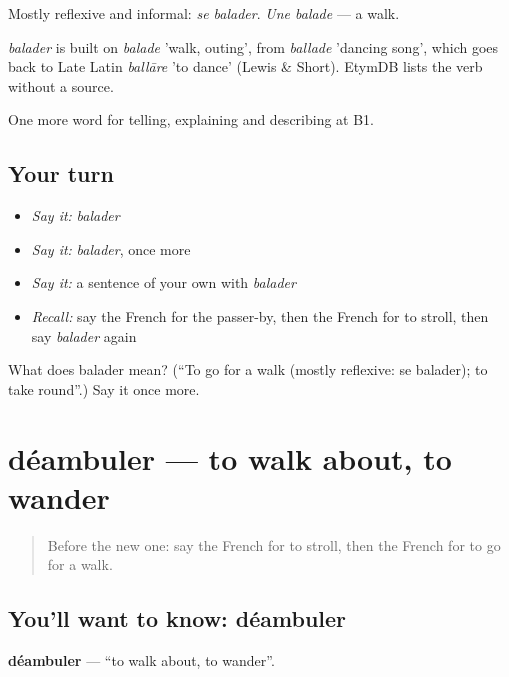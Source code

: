 Mostly reflexive and informal: \emph{se balader}. \emph{Une balade} — a walk.

\begin{cousinweb}
\emph{balader} is built on \emph{balade} 'walk, outing', from \emph{ballade} 'dancing song', which goes back to Late Latin \emph{ballāre} 'to dance' (Lewis \& Short). EtymDB lists the verb without a source.
\end{cousinweb}

\begin{grammarlens}[title={What you've built}]
One more word for telling, explaining and describing at B1.
\end{grammarlens}

\subsection*{Your turn}
\begin{itemize}
\raggedright
  \item \emph{Say it:} \emph{balader}
  \item \emph{Say it:} \emph{balader}, once more
  \item \emph{Say it:} a sentence of your own with \emph{balader}
  \item \emph{Recall:} say the French for the passer-by, then the French for to stroll, then say \emph{balader} again
\end{itemize}

\begin{tcolorbox}[breakable,colback=teal!4,colframe=teal!35!black,title={Before you move on}]
What does balader mean? (\textquotedblleft{}To go for a walk (mostly reflexive: se balader); to take round\textquotedblright{}.) Say it once more.
\end{tcolorbox}
\section[déambuler]{déambuler — to walk about, to wander}

\label{lesson:FR-C438-deambuler}



\begin{quote}
Before the new one: say the French for to stroll, then the French for to go for a walk.
\end{quote}

\subsection*{You'll want to know: déambuler}
\textbf{déambuler} — \textquotedblleft{}to walk about, to wander\textquotedblright{}.

